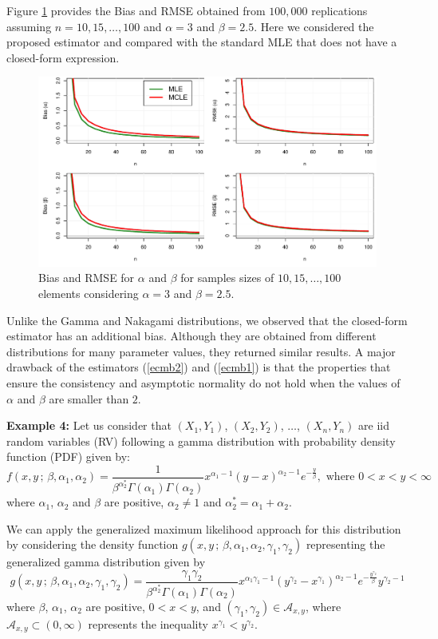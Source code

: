 \documentclass[10pt,a4paper,onecolumn]{article} %
\begin{document}
Figure \ref{fg3} provides the Bias and RMSE obtained from $100,000$ replications assuming $n=10,15,\ldots,100$ and $\alpha=3$ and $\beta=2.5$. Here we considered the proposed estimator and compared with the standard MLE that does not have a closed-form expression.
\begin{figure}[!ht]
\centering
\includegraphics[scale=0.65]{biasbeta.pdf}	
\caption{Bias and RMSE for $\alpha$ and $\beta$ for samples sizes of $10,15,\ldots,100$ elements considering $\alpha=3$ and $\beta=2.5$.}\label{fg3}
\end{figure}

Unlike the Gamma and Nakagami distributions, we observed that the closed-form estimator has an additional bias. Although they are obtained from different distributions for many parameter values, they returned similar results. A major drawback of the estimators (\ref{ecmb2}) and (\ref{ecmb1}) is that the properties that ensure the consistency and asymptotic normality do not hold when the values of $\alpha$ and $\beta$ are smaller than $2$.

\noindent\textbf{Example 4:} Let us consider that $(X_1,Y_1)$, $(X_2,Y_2)$, $\ldots$, $(X_n,Y_n)$   are iid random variables (RV) following a gamma distribution with probability density function (PDF) given by:
\begin{equation}\label{fdpbigamma}
f(x, y\,;\, \beta,\alpha_1,\alpha_2) = \frac{1}{\beta^{\alpha^*_2}\Gamma(\alpha_1)\Gamma(\alpha_2)} x^{\alpha_1 - 1} (y - x)^{\alpha_2 - 1} e^{-\frac{y}{\beta}},\mbox{ where } 0 < x < y < \infty
\end{equation}
where $\alpha_1$, $\alpha_2$ and $\beta$ are positive, $\alpha_2\neq 1$ and $\alpha_2^*=\alpha_1+\alpha_2$.

We can apply the generalized maximum likelihood approach for this distribution by considering the density function $g(x,y\,;\,\beta,\alpha_1,\alpha_2,\gamma_1,\gamma_2)$ representing the generalized gamma distribution given by
\begin{equation*}g(x,y\,;\,\beta,\alpha_1,\alpha_2,\gamma_1,\gamma_2) = \frac{\gamma_1\gamma_2}{\beta^{\alpha^*_2} \Gamma(\alpha_1)\Gamma(\alpha_2)} x^{\alpha_1\gamma_1-1} \left(y^{\gamma_2} - x^{\gamma_1}\right)^{\alpha_2-1} e^{-\frac{y^{\gamma_2}}{\beta}} y^{\gamma_2 - 1}
\end{equation*}
where $\beta$, $\alpha_1$, $\alpha_2$ are positive, $0<x<y$, and $(\gamma_1, \gamma_2)\in \mathcal{A}_{x,y}$, where $\mathcal{A}_{x,y}\subset (0,\infty)$ represents the inequality $x^{\gamma_1}<y^{\gamma_2}$.
\end{document}
